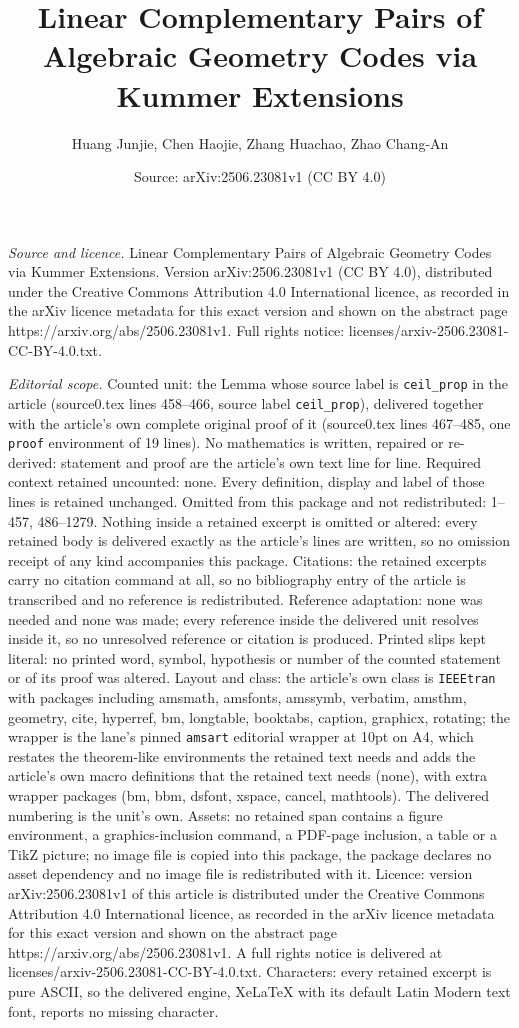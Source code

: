 \documentclass[10pt,a4paper]{amsart}
\title[Linear Complementary Pairs of Algebraic Geometry Codes via K]{Linear Complementary Pairs of Algebraic Geometry Codes via Kummer Extensions}
\author{Huang Junjie, Chen Haojie, Zhang Huachao, Zhao Chang-An}
\date{Source: arXiv:2506.23081v1 (CC BY 4.0)}
\begin{document}
\maketitle

\noindent\emph{Source and licence.} Linear Complementary Pairs of Algebraic Geometry Codes via Kummer Extensions. Version arXiv:2506.23081v1 (CC BY 4.0), distributed under the Creative Commons Attribution 4.0 International licence, as recorded in the arXiv licence metadata for this exact version and shown on the abstract page https://arxiv.org/abs/2506.23081v1. Full rights notice: licenses/arxiv-2506.23081-CC-BY-4.0.txt.\par\smallskip

\noindent\textit{Editorial scope.} Counted unit: the Lemma whose source label is \texttt{ceil\_prop} in the article (source0.tex lines 458--466, source label \texttt{ceil\_prop}), delivered together with the article's own complete original proof of it (source0.tex lines 467--485, one \texttt{proof} environment of 19 lines). No mathematics is written, repaired or re-derived: statement and proof are the article's own text line for line. Required context retained uncounted: none. Every definition, display and label of those lines is retained unchanged. Omitted from this package and not redistributed: 1--457, 486--1279. Nothing inside a retained excerpt is omitted or altered: every retained body is delivered exactly as the article's lines are written, so no omission receipt of any kind accompanies this package. Citations: the retained excerpts carry no citation command at all, so no bibliography entry of the article is transcribed and no reference is redistributed. Reference adaptation: none was needed and none was made; every reference inside the delivered unit resolves inside it, so no unresolved reference or citation is produced. Printed slips kept literal: no printed word, symbol, hypothesis or number of the counted statement or of its proof was altered. Layout and class: the article's own class is \texttt{IEEEtran} with packages including amsmath, amsfonts, amssymb, verbatim, amsthm, geometry, cite, hyperref, bm, longtable, booktabs, caption, graphicx, rotating; the wrapper is the lane's pinned \texttt{amsart} editorial wrapper at 10pt on A4, which restates the theorem-like environments the retained text needs and adds the article's own macro definitions that the retained text needs (none), with extra wrapper packages (bm, bbm, dsfont, xspace, cancel, mathtools). The delivered numbering is the unit's own. Assets: no retained span contains a figure environment, a graphics-inclusion command, a PDF-page inclusion, a table or a TikZ picture; no image file is copied into this package, the package declares no asset dependency and no image file is redistributed with it. Licence: version arXiv:2506.23081v1 of this article is distributed under the Creative Commons Attribution 4.0 International licence, as recorded in the arXiv licence metadata for this exact version and shown on the abstract page https://arxiv.org/abs/2506.23081v1. A full rights notice is delivered at licenses/arxiv-2506.23081-CC-BY-4.0.txt. Characters: every retained excerpt is pure ASCII, so the delivered engine, XeLaTeX with its default Latin Modern text font, reports no missing character.
\end{document}
